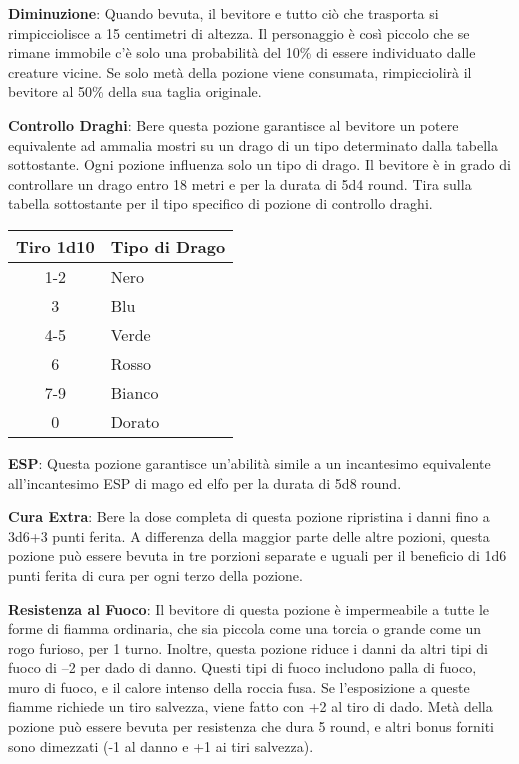\documentclass{article}
\begin{document}
\begin{multicols}{2}
\textbf{Diminuzione}: Quando bevuta, il bevitore e tutto ciò che trasporta si rimpicciolisce a 15 centimetri di altezza. Il personaggio è così piccolo che se rimane immobile c'è solo una probabilità del 10\% di essere individuato dalle creature vicine. Se solo metà della pozione viene consumata, rimpicciolirà il bevitore al 50\% della sua taglia originale.

\textbf{Controllo Draghi}: Bere questa pozione garantisce al bevitore un potere equivalente ad ammalia mostri su un drago di un tipo determinato dalla tabella sottostante. Ogni pozione influenza solo un tipo di drago. Il bevitore è in grado di controllare un drago entro 18 metri e per la durata di 5d4 round. Tira sulla tabella sottostante per il tipo specifico di pozione di controllo draghi.

\begin{table}[h]
\centering
\begin{tabular}{|c|l|}
\hline
\textbf{Tiro 1d10} & \textbf{Tipo di Drago} \\
\hline
1-2 & Nero \\
3 & Blu \\
4-5 & Verde \\
6 & Rosso \\
7-9 & Bianco \\
0 & Dorato \\
\hline
\end{tabular}

\end{table}

\textbf{ESP}: Questa pozione garantisce un'abilità simile a un incantesimo equivalente all'incantesimo ESP di mago ed elfo per la durata di 5d8 round.

\textbf{Cura Extra}: Bere la dose completa di questa pozione ripristina i danni fino a 3d6+3 punti ferita. A differenza della maggior parte delle altre pozioni, questa pozione può essere bevuta in tre porzioni separate e uguali per il beneficio di 1d6 punti ferita di cura per ogni terzo della pozione.

\textbf{Resistenza al Fuoco}: Il bevitore di questa pozione è impermeabile a tutte le forme di fiamma ordinaria, che sia piccola come una torcia o grande come un rogo furioso, per 1 turno. Inoltre, questa pozione riduce i danni da altri tipi di fuoco di –2 per dado di danno. Questi tipi di fuoco includono palla di fuoco, muro di fuoco, e il calore intenso della roccia fusa. Se l'esposizione a queste fiamme richiede un tiro salvezza, viene fatto con +2 al tiro di dado. Metà della pozione può essere bevuta per resistenza che dura 5 round, e altri bonus forniti sono dimezzati (-1 al danno e +1 ai tiri salvezza).


\end{multicols}
\end{document}
